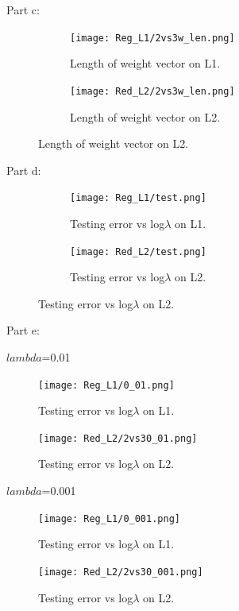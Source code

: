 \documentclass{article} %
\begin{document}
Part c:
\begin{figure}[H]
\centering
\begin{subfigure}{.5\textwidth}
	\centering
	\texttt{[image: Reg\_L1/2vs3w\_len.png]}
    \caption{Length of weight vector on L1.}
\end{subfigure}%
\begin{subfigure}{.5\textwidth}
    \centering
    \texttt{[image: Red\_L2/2vs3w\_len.png]}
    \caption{Length of weight vector on L2.}
\end{subfigure}
\end{figure}

Part d:

\begin{figure}[H]
\centering
\begin{subfigure}{.5\textwidth}
	\centering
	\texttt{[image: Reg\_L1/test.png]}
	\caption{Testing error vs log$\lambda$ on L1.}
\end{subfigure}%
\begin{subfigure}{.5\textwidth}
    \centering
	\texttt{[image: Red\_L2/test.png]}
	\caption{Testing error vs log$\lambda$ on L2.}
\end{subfigure}
\end{figure}

Part e:

$lambda$=0.01

\begin{figure}[H]
\begin{center}
\texttt{[image: Reg\_L1/0\_01.png]}
\end{center}
\caption{Testing error vs log$\lambda$ on L1.}
\end{figure}

\begin{figure}[H]
\begin{center}
\texttt{[image: Red\_L2/2vs30\_01.png]}
\end{center}
\caption{Testing error vs log$\lambda$ on L2.}
\end{figure}

$lambda$=0.001

\begin{figure}[H]
\begin{center}
\texttt{[image: Reg\_L1/0\_001.png]}
\end{center}
\caption{Testing error vs log$\lambda$ on L1.}
\end{figure}

\begin{figure}[H]
\begin{center}
\texttt{[image: Red\_L2/2vs30\_001.png]}
\end{center}
\caption{Testing error vs log$\lambda$ on L2.}
\end{figure}
\end{document}
